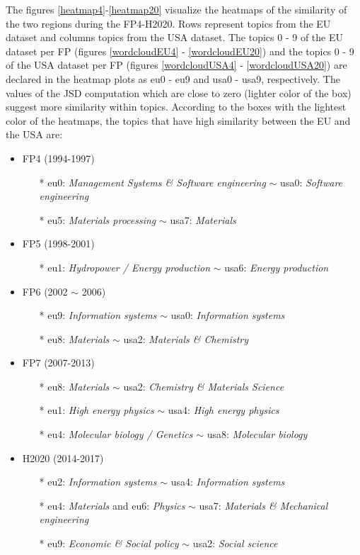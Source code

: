\documentclass[12pt]{report}
\begin{document}
The figures \ref{heatmap4}-\ref{heatmap20} visualize the heatmaps of
the similarity of the two regions during the FP4-H2020. Rows represent
topics from the EU dataset and columns topics from the USA dataset.
The topics 0 - 9 of the EU dataset per FP (figures \ref{wordcloudEU4} -
\ref{wordcloudEU20}) and the topics 0 - 9 of the USA dataset per FP (figures
\ref{wordcloudUSA4} - \ref{wordcloudUSA20}) are declared in the heatmap plots as
eu0 - eu9 and usa0 - usa9, respectively.
The values of the JSD computation which are close to zero (lighter
color of the box) suggest more similarity within topics. According to 
the boxes with the lightest color of the heatmaps, 
the topics that have high similarity between the EU and the USA are:

\begin{itemize}
\item FP4 (1994-1997)
\begin{itemize}
\item[*] eu0: \emph{Management Systems \& Software engineering} $\sim$ usa0: \emph{Software engineering}
\item[*] eu5: \emph{Materials processing} $\sim$ usa7: \emph{Materials}
\end{itemize}
\item FP5 (1998-2001)
\begin{itemize}
\item[*] eu1: \emph{Hydropower / Energy production} $\sim$ usa6: \emph{Energy production}
\end{itemize}
\item FP6 (2002 $\sim$ 2006)
\begin{itemize}
\item[*] eu9: \emph{Information systems} $\sim$ usa0: \emph{Information systems}
\item[*] eu8: \emph{Materials} $\sim$ usa2: \emph{Materials \& Chemistry}
\end{itemize}
\item FP7 (2007-2013)
\begin{itemize}
\item[*] eu8: \emph{Materials} $\sim$ usa2: \emph{Chemistry \& Materials Science}
\item[*] eu1: \emph{High energy physics} $\sim$ usa4: \emph{High energy physics}
\item[*] eu4: \emph{Molecular biology / Genetics} $\sim$ usa8: \emph{Molecular biology}
\end{itemize}
\item H2020 (2014-2017)
\begin{itemize}
\item[*] eu2: \emph{Information systems} $\sim$ usa4: \emph{Information systems}
\item[*] eu4: \emph{Materials} and eu6: \emph{Physics} $\sim$ usa7: \emph{Materials \& Mechanical engineering}
\item[*] eu9: \emph{Economic \& Social policy} $\sim$ usa2: \emph{Social science}
\end{itemize}
\end{itemize}
\end{document}
